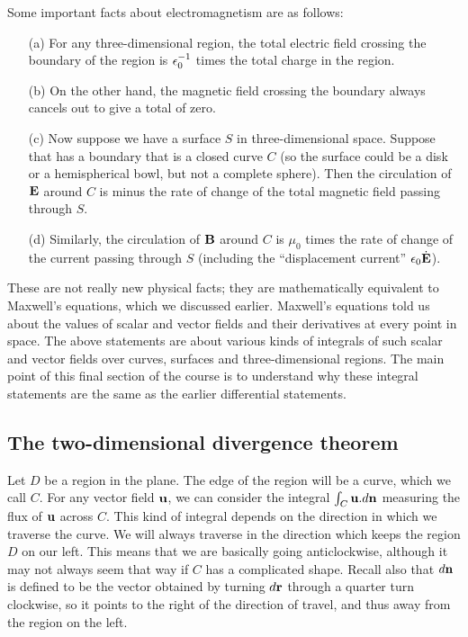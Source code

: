 \documentclass[reqno]{amsart}
\theoremstyle{definition}
\begin{document}
Some important facts about electromagnetism are as follows:
\begin{itemize}
 \item[(a)] For any three-dimensional region, the total electric field
  crossing the boundary of the region is $\epsilon_0^{-1}$ times the total
  charge in the region.
 \item[(b)] On the other hand, the magnetic field crossing the
  boundary always cancels out to give a total of zero.
 \item[(c)] Now suppose we have a surface $S$ in three-dimensional space.
  Suppose that has a boundary that is a closed curve $C$ (so the surface
  could be a disk or a hemispherical bowl, but not a complete sphere).  
  Then the circulation of $\mathbf{E}$ around $C$ is minus the rate of change
  of the total magnetic field passing through $S$.
 \item[(d)] Similarly, the circulation of $\mathbf{B}$ around $C$ is $\mu_0$
  times the rate of change of the current passing through $S$
  (including the ``displacement current'' $\epsilon_0\dot{\mathbf{E}}$).
\end{itemize}
These are not really new physical facts; they are mathematically
equivalent to Maxwell's equations, which we discussed earlier.
Maxwell's equations told us about the values of scalar and vector
fields and their derivatives at every point in space.  The above
statements are about various kinds of integrals of such scalar and
vector fields over curves, surfaces and three-dimensional regions.
The main point of this final section of the course is to understand
why these integral statements are the same as the earlier differential
statements.

\subsection{The two-dimensional divergence theorem}

Let $D$ be a region in the plane.  The edge of the region will be a
curve, which we call $C$.  For any vector field $\mathbf{u}$, we can consider
the integral $\int_C\mathbf{u}.d\mathbf{n}$ measuring the flux of $\mathbf{u}$ across $C$.
This kind of integral depends on the direction in which we traverse
the curve.  We will always traverse in the direction which keeps the
region $D$ on our left.  This means that we are basically going
anticlockwise, although it may not always seem that way if $C$ has a
complicated shape.  Recall also that $d\mathbf{n}$ is defined to be the 
vector obtained by turning $d\mathbf{r}$ through a quarter turn clockwise, 
so it points to the right of the direction of travel, and thus away 
from the region on the left.
\end{document}
